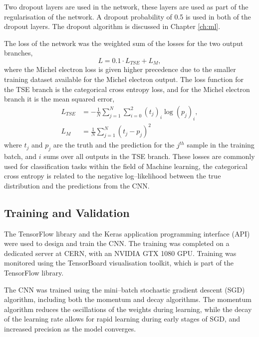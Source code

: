 Two dropout layers are used in the network, these layers are used as part of the
regularisation of the network. A dropout probability of 0.5 is used in both of
the dropout layers. The dropout algorithm is discussed in Chapter \ref{ch:ml}.

The loss of the network was the weighted sum of the losses for the two output
branches,
\begin{equation*}
	L = 0.1 \cdot L_{TSE} + L_M,
\end{equation*}
where the Michel electron loss is given higher precedence due to the smaller
training dataset available for the Michel electron output. The loss function for
the TSE branch is the categorical cross entropy 
loss\cite{750fabedbacb467c8fafd98b87f77436}, and for the Michel electron branch
it is the mean squared error\cite{mse_springer},
\begin{align*}
	L_{TSE} &= - \frac{1}{N} \sum_{j=1}^N \sum_{i=0}^2 (t_j)_i \log (p_j)_i, \\
	L_M &= \frac{1}{N} \sum_{j=1}^N (t_j - p_j)^2
\end{align*}
where $t_j$ and $p_j$ are the truth and the prediction for the $j^{th}$ sample 
in the training batch, and $i$ sums over all outputs in the TSE branch. These
losses are commonly used for classification tasks within the field of Machine 
learning, the categorical cross entropy is related to the negative
log--likelihood between the true distribution and the predictions from the 
CNN\cite{GoodfellowIan2016Dl}. 

\subsection{Training and Validation}
The TensorFlow\cite{45381} library and the Keras\cite{chollet2015keras} 
application programming interface (API) were used to design and train the CNN. 
The training was completed on a dedicated \protodune{} server at CERN, with an 
NVIDIA GTX 1080 GPU. Training was monitored using the TensorBoard visualisation 
toolkit\cite{tensorboard}, which is part of the TensorFlow library. 

The CNN was trained using the mini--batch stochastic gradient descent (SGD)
algorithm, including both the momentum and decay algorithms\cite{Reed1999}. 
The momentum algorithm reduces the oscillations of the weights during 
learning, while the decay of the learning rate allows for rapid learning 
during early stages of SGD, and increased precision as the model converges. 

